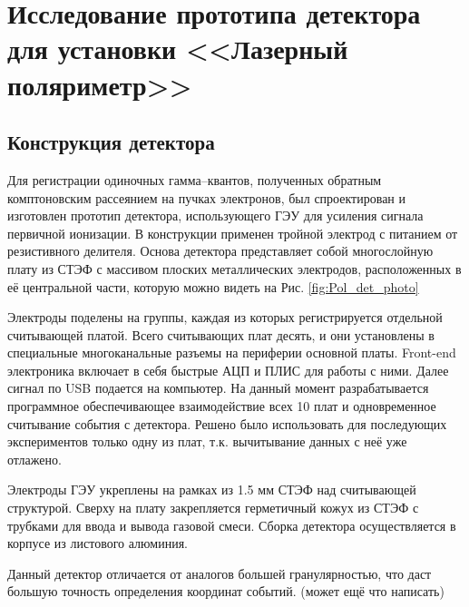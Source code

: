 \section{Исследование прототипа детектора для установки <<Лазерный поляриметр>>}
\label{sec:pol_examine}
\subsection{Конструкция детектора}
Для регистрации одиночных гамма--квантов, полученных обратным комптоновским рассеянием на пучках электронов, был спроектирован и изготовлен прототип детектора, использующего ГЭУ для усиления сигнала первичной ионизации. В конструкции применен тройной электрод с питанием от резистивного делителя. Основа детектора представляет собой многослойную плату из СТЭФ с массивом плоских металлических электродов, расположенных в её центральной части, которую можно видеть на Рис. \ref{fig:Pol_det_photo} 
\par Электроды поделены на группы, каждая из которых регистрируется отдельной считывающей платой. Всего считывающих плат десять, и они установлены в специальные многоканальные разъемы на периферии основной платы. Front-end электроника включает в себя быстрые АЦП и ПЛИС для работы с ними. Далее сигнал по USB подается на компьютер. На данный момент разрабатывается программное обеспечивающее взаимодействие всех 10 плат и одновременное считывание события с детектора. Решено было использовать для последующих экспериментов только одну из плат, т.к. вычитывание данных с неё уже отлажено. 
\par Электроды ГЭУ укреплены на рамках из 1.5 мм СТЭФ над считывающей структурой. Сверху на плату закрепляется герметичный кожух из СТЭФ с трубками для ввода и вывода газовой смеси. Сборка детектора осуществляется в корпусе из листового алюминия.
\par Данный детектор отличается от аналогов большей гранулярностью, что даст большую точность определения координат событий. (может ещё что написать)
